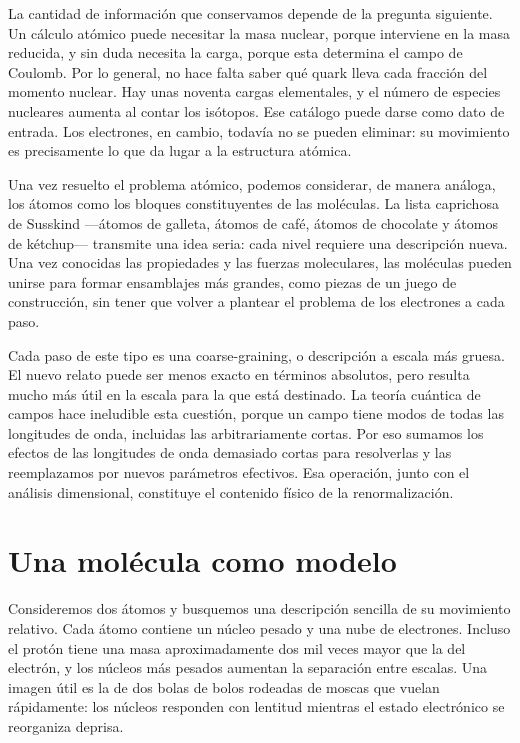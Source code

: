 La cantidad de información que conservamos depende de la pregunta siguiente. Un cálculo atómico puede necesitar la masa nuclear, porque interviene en la masa reducida, y sin duda necesita la carga, porque esta determina el campo de Coulomb. Por lo general, no hace falta saber qué quark lleva cada fracción del momento nuclear. Hay unas noventa cargas elementales, y el número de especies nucleares aumenta al contar los isótopos. Ese catálogo puede darse como dato de entrada. Los electrones, en cambio, todavía no se pueden eliminar: su movimiento es precisamente lo que da lugar a la estructura atómica.

Una vez resuelto el problema atómico, podemos considerar, de manera análoga, los átomos como los bloques constituyentes de las moléculas. La lista caprichosa de Susskind —átomos de galleta, átomos de café, átomos de chocolate y átomos de kétchup— transmite una idea seria: cada nivel requiere una descripción nueva. Una vez conocidas las propiedades y las fuerzas moleculares, las moléculas pueden unirse para formar ensamblajes más grandes, como piezas de un juego de construcción, sin tener que volver a plantear el problema de los electrones a cada paso.

Cada paso de este tipo es una coarse-graining, o descripción a escala más gruesa. El nuevo relato puede ser menos exacto en términos absolutos, pero resulta mucho más útil en la escala para la que está destinado. La teoría cuántica de campos hace ineludible esta cuestión, porque un campo tiene modos de todas las longitudes de onda, incluidas las arbitrariamente cortas. Por eso sumamos los efectos de las longitudes de onda demasiado cortas para resolverlas y las reemplazamos por nuevos parámetros efectivos. Esa operación, junto con el análisis dimensional, constituye el contenido físico de la renormalización.

\section{Una molécula como modelo}

Consideremos dos átomos y busquemos una descripción sencilla de su movimiento relativo. Cada átomo contiene un núcleo pesado y una nube de electrones. Incluso el protón tiene una masa aproximadamente dos mil veces mayor que la del electrón, y los núcleos más pesados aumentan la separación entre escalas. Una imagen útil es la de dos bolas de bolos rodeadas de moscas que vuelan rápidamente: los núcleos responden con lentitud mientras el estado electrónico se reorganiza deprisa.

